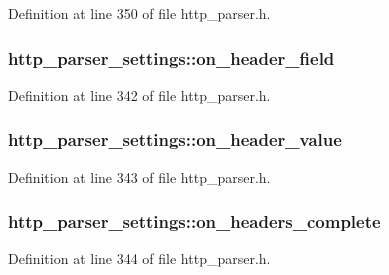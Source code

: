 Definition at line 350 of file http\-\_\-parser.\-h.

\hypertarget{structhttp__parser__settings_acfb3fd7947c5ff3e16649c71aa13bff2}{
\subsubsection[{on\-\_\-header\-\_\-field}]{ http\-\_\-parser\-\_\-settings\-::on\-\_\-header\-\_\-field}}\label{structhttp__parser__settings_acfb3fd7947c5ff3e16649c71aa13bff2}


Definition at line 342 of file http\-\_\-parser.\-h.

\hypertarget{structhttp__parser__settings_a2af4e9085fa79ee52b31e626179bc561}{
\subsubsection[{on\-\_\-header\-\_\-value}]{ http\-\_\-parser\-\_\-settings\-::on\-\_\-header\-\_\-value}}\label{structhttp__parser__settings_a2af4e9085fa79ee52b31e626179bc561}


Definition at line 343 of file http\-\_\-parser.\-h.

\hypertarget{structhttp__parser__settings_a743b24c8f33e0f1cf60a96c824c42071}{
\subsubsection[{on\-\_\-headers\-\_\-complete}]{ http\-\_\-parser\-\_\-settings\-::on\-\_\-headers\-\_\-complete}}\label{structhttp__parser__settings_a743b24c8f33e0f1cf60a96c824c42071}


Definition at line 344 of file http\-\_\-parser.\-h.

